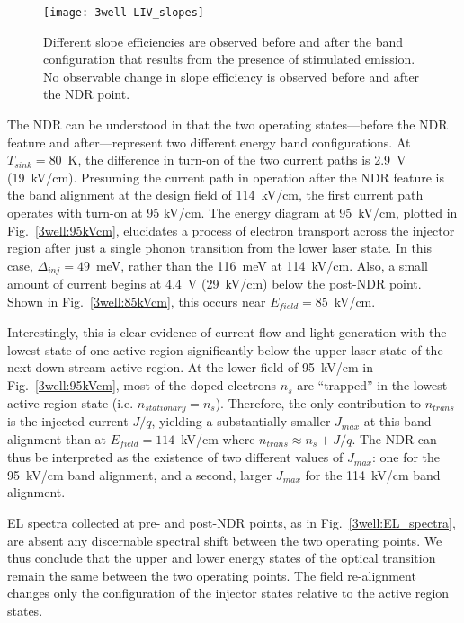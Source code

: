 \begin{figure}[tp]
\centering
\texttt{[image: 3well-LIV\_slopes]}
\caption[Three injector well LIV near $T_{sink}=130~\tn{K}$]{  Different slope efficiencies are observed before and after the band configuration that results from the presence of stimulated emission.  No observable change in slope efficiency is observed before and after the NDR point.}
\label{3well:LIV_slopes}
\end{figure}

The NDR can be understood in that the two operating states---before the NDR feature and after---represent two different energy band configurations.  At $T_{sink}=80$~K, the difference in turn-on of the two current paths is 2.9~V (19~kV/cm).  Presuming the current path in operation after the NDR feature is the band alignment at the design field of 114~kV/cm, the first current path operates with turn-on at 95 kV/cm.  The energy diagram at 95~kV/cm, plotted in Fig.~\ref{3well:95kVcm}, elucidates a process of electron transport across the injector region after just a single phonon transition from the lower laser state.  In this case, $\Delta_{inj}=49$~meV, rather than the 116~meV at 114~kV/cm.  Also, a small amount of current begins at 4.4~V (29~kV/cm) below the post-NDR point.  Shown in Fig.~\ref{3well:85kVcm}, this occurs near $E_\textit{field}=85$~kV/cm.

Interestingly, this is clear evidence of current flow and light generation with the lowest state of one active region significantly below the upper laser state of the next down-stream active region.  At the lower field of 95~kV/cm in Fig.~\ref{3well:95kVcm}, most of the doped electrons $n_s$ are ``trapped'' in the lowest active region state (i.e. $n_\textit{stationary}=n_s$).  Therefore, the only contribution to $n_\textit{trans}$ is the injected current $J/q$, yielding a substantially smaller $J_{max}$ at this band alignment than at $E_\textit{field}=114$~kV/cm where $n_\textit{trans}\approx n_s+J/q$.  The NDR can thus be interpreted as the existence of two different values of $J_{max}$: one for the 95~kV/cm band alignment, and a second, larger $J_{max}$ for the 114~kV/cm band alignment.

EL spectra collected at pre- and post-NDR points, as in Fig.~\ref{3well:EL_spectra}, are absent any discernable spectral shift between the two operating points.  We thus conclude that the upper and lower energy states of the optical transition remain the same between the two operating points.  The field re-alignment changes only the configuration of the injector states relative to the active region states.

